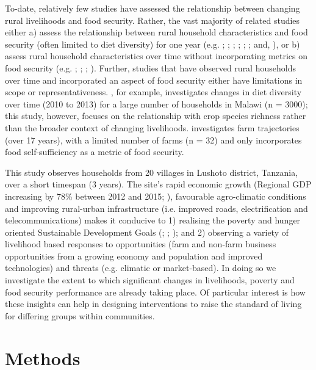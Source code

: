 To-date, relatively few studies have assessed the relationship between changing rural livelihoods and food security. Rather, the vast majority of related studies either a) assess the relationship between rural household characteristics and food security (often limited to diet diversity) for one year (e.g. \citealp{Bellon2016}; \citealp{Koppmair2017325}; \citealp{Luckett20152479}; \citealp{MKaibi2015}; \citealp{Sibhatu201510657}; \citealp{Snapp2015}; and, \citealp{Dillon2014}), or b) assess rural household characteristics over time without incorporating metrics on food security (e.g. \citealp{Ollenburger2016}; \citealp{Valbuena20151395}; \citealp{Ulrich2012241}; \citealp{Orr20011325}). Further, studies that have observed rural households over time and incorporated an aspect of food security either have limitations in scope or representativeness. \citet{Jones2016}, for example, investigates changes in diet diversity over time (2010 to 2013) for a large number of households in Malawi (n = 3000); this study, however, focuses on the relationship with crop species richness rather than the broader context of changing livelihoods. \citet{Falconnier2015} investigates farm trajectories (over 17 years), with a limited number of farms (n = 32) and only incorporates food self-sufficiency as a metric of food security.

This study observes households from 20 villages in Lushoto district, Tanzania, over a short timespan (3 years). The site's rapid economic growth (Regional GDP increasing by 78\% between 2012 and 2015; \citealp{NationalBureauofStatisticsTanzaniaNBS2016}), favourable agro-climatic conditions and improving rural-urban infrastructure (i.e. improved roads, electrification and telecommunications) makes it conducive to 1) realising the poverty and hunger oriented Sustainable Development Goals (\citealp{Frelat2016458}; \citealp{Dorward2009}; \citealp{Pender2001}); and 2) observing a variety of livelihood based responses to opportunities (farm and non-farm business opportunities from a growing economy and population and improved technologies) and threats (e.g. climatic or market-based). In doing so we investigate the extent to which significant changes in livelihoods, poverty and food security performance are already taking place. Of particular interest is how these insights can help in designing interventions to raise the standard of living for differing groups within communities.

\section{Methods}

